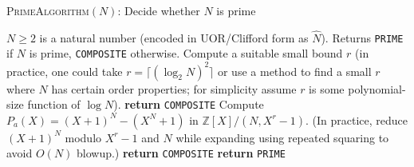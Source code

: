\documentclass[11pt]{article}
\begin{document}
{\begin{algorithm}[H]
\caption{\textsc{PrimeAlgorithm}$(N)$: Decide whether $N$ is prime}\label{alg:prime}
\begin{algorithmic}[1]
\Require $N \ge 2$ is a natural number (encoded in UOR/Clifford form as $\hat{N}$).
\Ensure Returns \texttt{PRIME} if $N$ is prime, \texttt{COMPOSITE} otherwise.
\State Compute a suitable small bound $r$ (in practice, one could take $r = \lceil (\log_2 N)^2 \rceil$ or use a method to find a small $r$ where $N$ has certain order properties; for simplicity assume $r$ is some polynomial-size function of $\log N$).
        \State \textbf{return} \texttt{COMPOSITE} 
    \EndIf
\EndFor
\State {}
    \State Compute $P_a(X) = (X+1)^N - (X^N + 1)$ in $\mathbb{Z}[X]/(N, X^r - 1)$.
    \State (In practice, reduce $(X+1)^N$ modulo $X^r - 1$ and $N$ while expanding using repeated squaring to avoid $O(N)$ blowup.)
        \State \textbf{return} \texttt{COMPOSITE} 
    \EndIf
\EndFor
\State \textbf{return} \texttt{PRIME} 
\end{algorithmic}
\end{algorithm}

}
\end{document}
